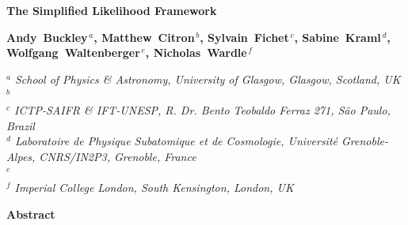 \documentclass[11pt]{article}
\begin{document}
\vspace*{30mm}

\begin{center}
{\LARGE \bf The Simplified Likelihood Framework
}
\par\vspace*{20mm}\par

{\large \bf Andy~Buckley$^{\,a}$, Matthew~Citron$^{\,b}$,  Sylvain~Fichet$^{\,c}$, Sabine~Kraml$^{\,d}$, Wolfgang~Waltenberger$^{\,e}$, Nicholas~Wardle$^{\,f}$}

\bigskip

{\em $^a$ School of Physics \& Astronomy, University of Glasgow, Glasgow, Scotland, UK}
\\
{\em $^b$ }
\\
{\em $^c$ ICTP-SAIFR \& IFT-UNESP, R. Dr. Bento Teobaldo Ferraz 271, S\~ao Paulo, Brazil}
\\
{\em $^d$ Laboratoire de Physique Subatomique et de Cosmologie, Universit\'e Grenoble-Alpes, CNRS/IN2P3, Grenoble, France  }
\\
{\em $^e$ }
\\
{\em $^f$ Imperial College London, South Kensington, London, UK }
\vspace*{5mm}



\vspace*{15mm}

{  \bf  Abstract }

\end{center}
\vspace*{1mm}




\noindent
\begin{abstract}

We present the Simplified Likelihood framework, a systematic approximation scheme  for experimental likelihoods such as those originating from LHC experiments. This framework  can be used  to simplify data analyses and to transmit realistic experimental likelihoods to the community.
We present an efficient method to compute the parameters of the simplified likelihood  from Monte Carlo simulations. The approach is validated using a realistic LHC-like toy search. \ldots




\end{abstract}

\end{document}
